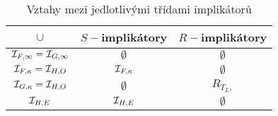 \begin{table}[ht!]
    \caption{Vztahy mezi jedlotlivými třídami implikátor\r u\cite{hlinena}}
    \centering 
    \begin{tabular}{|c|c|c|}
    \hline
     $\cup$ & $S-$implikátory & $R-$implikátory\\
    \hline
    ${\cal I}_{F, \infty} = {\cal I}_{G, \infty}$   & $ \emptyset$ & $\emptyset$ \\
    \hline
    ${\cal I}_{F, \kappa} = {\cal I}_{H, O}$   &  ${\cal I}_{F, \kappa}$ &
    $\emptyset$ \\
    \hline
    ${\cal I}_{G, \kappa} = {\cal I}_{H, O}$   &  $\emptyset$ &
    $R_{T_L,}$ \\
    \hline
    ${\cal I}_{H, E}$  &${\cal I}_{H, E}$ &  $\emptyset$\\
    \hline
    \end{tabular}
\end{table}

